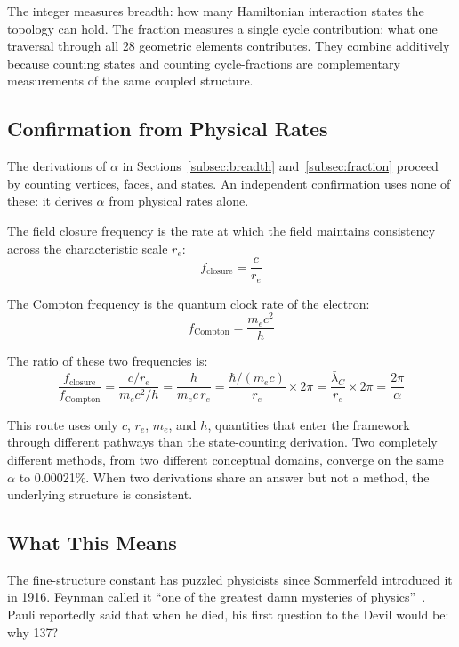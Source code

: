\documentclass[aps,prd,preprint,superscriptaddress,showpacs,preprintnumbers,amsmath,amssymb,nofootinbib]{revtex4-2}
\begin{document}
The integer measures breadth: how many Hamiltonian interaction states the topology can hold. The fraction measures a single cycle contribution: what one traversal through all 28 geometric elements contributes. They combine additively because counting states and counting cycle-fractions are complementary measurements of the same coupled structure.

\subsection{Confirmation from Physical Rates}
\label{subsec:rates}

The derivations of $\alpha$ in Sections~\ref{subsec:breadth} and~\ref{subsec:fraction} proceed by counting vertices, faces, and states. An independent confirmation uses none of these: it derives $\alpha$ from physical rates alone.

The field closure frequency is the rate at which the field maintains consistency across the characteristic scale $r_e$:
\begin{equation}
f_{\text{closure}} = \frac{c}{r_e}
\end{equation}

The Compton frequency is the quantum clock rate of the electron:
\begin{equation}
f_{\text{Compton}} = \frac{m_e c^2}{h}
\end{equation}

The ratio of these two frequencies is:
\begin{equation}
\frac{f_{\text{closure}}}{f_{\text{Compton}}} = \frac{c/r_e}{m_e c^2/h} = \frac{h}{m_e c\,r_e} = \frac{\hbar/(m_e c)}{r_e} \times 2\pi = \frac{\bar{\lambda}_C}{r_e} \times 2\pi = \frac{2\pi}{\alpha}
\end{equation}

This route uses only $c$, $r_e$, $m_e$, and $h$, quantities that enter the framework through different pathways than the state-counting derivation. Two completely different methods, from two different conceptual domains, converge on the same $\alpha$ to 0.00021\%. When two derivations share an answer but not a method, the underlying structure is consistent.

\subsection{What This Means}
\label{subsec:alpha-meaning}

The fine-structure constant has puzzled physicists since Sommerfeld introduced it in 1916. Feynman called it ``one of the greatest damn mysteries of physics''~\cite{feynman1985}. Pauli reportedly said that when he died, his first question to the Devil would be: why 137?
\end{document}
